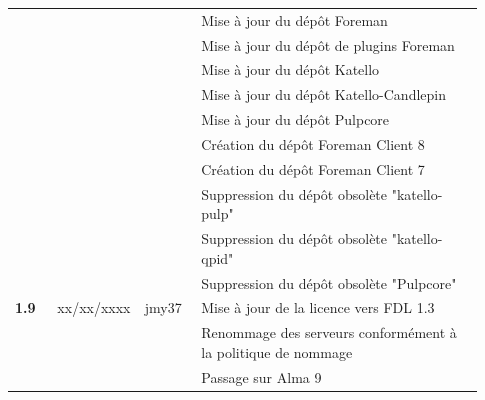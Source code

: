 \documentclass[a4paper, oneside, 12pt, final, headsepline, footsepline]{scrartcl}
\begin{document}
\begin{table}[H]
\begin{tabular}{|>{\centering\arraybackslash}p{0.09\linewidth}|>{\centering\arraybackslash}p{0.12\linewidth}|>{\raggedright\arraybackslash}p{0.12\linewidth}|>{\raggedright\arraybackslash}p{0.6\linewidth}|}
                         &               &                 & Mise à jour du dépôt Foreman                                                                                 \\
                         &               &                 & Mise à jour du dépôt de plugins Foreman                                                                      \\
                         &               &                 & Mise à jour du dépôt Katello                                                                                 \\
                         &               &                 & Mise à jour du dépôt Katello-Candlepin                                                                       \\
                         &               &                 & Mise à jour du dépôt Pulpcore                                                                                \\
                         &               &                 & Création du dépôt Foreman Client 8                                                                           \\
                         &               &                 & Création du dépôt Foreman Client 7                                                                           \\
                         &               &                 & Suppression du dépôt obsolète "katello-pulp"                                                                 \\
                         &               &                 & Suppression du dépôt obsolète "katello-qpid"                                                                 \\
                         &               &                 & Suppression du dépôt obsolète "Pulpcore"                                                                     \\ \hline
        \textbf{1.9}     & xx/xx/xxxx    & jmy37           & Mise à jour de la licence vers FDL 1.3                                                                       \\
                         &               &                 & Renommage des serveurs conformément à la politique de nommage                                                \\
                         &               &                 & Passage sur Alma 9                                                                                           \\

\end{tabular}
\end{table}
\end{document}
